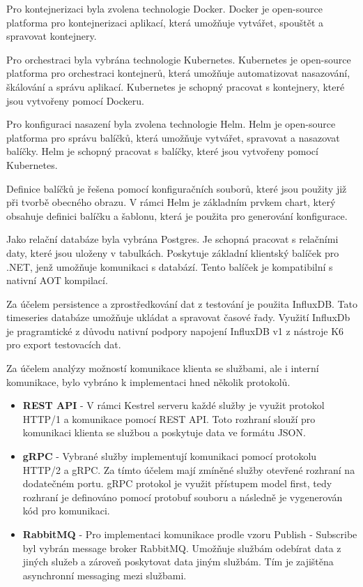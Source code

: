 Pro kontejnerizaci byla zvolena technologie Docker. Docker je open-source platforma pro kontejnerizaci aplikací, která umožňuje vytvářet, spouštět a spravovat kontejnery.

Pro orchestraci byla vybrána technologie Kubernetes. Kubernetes je open-source platforma pro orchestraci kontejnerů, která umožňuje automatizovat nasazování, škálování a správu aplikací. Kubernetes je schopný pracovat s kontejnery, které jsou vytvořeny pomocí Dockeru.


Pro konfiguraci nasazení byla zvolena technologie Helm. Helm je open-source platforma pro správu balíčků, která umožňuje vytvářet, spravovat a nasazovat balíčky. Helm je schopný pracovat s balíčky, které jsou vytvořeny pomocí Kubernetes.

Definice balíčků je řešena pomocí konfiguračních souborů, které jsou použity již při tvorbě obecného obrazu. V rámci Helm je základním prvkem chart, který obsahuje definici balíčku a šablonu, která je použita pro generování konfigurace.


Jako relační databáze byla vybrána Postgres. Je schopná pracovat s relačními daty, které jsou uloženy v tabulkách. Poskytuje základní klientský balíček pro .NET, jenž umožňuje komunikaci s databází. Tento balíček je kompatibilní s nativní AOT kompilací.

Za účelem persistence a zprostředkování dat z testování je použita InfluxDB. Tato timeseries databáze umožňuje ukládat a spravovat časové řady. Využití InfluxDb je pragramtické z důvodu nativní podpory napojení InfluxDB v1 z nástroje K6 pro export testovacích dat.


Za účelem analýzy možností komunikace klienta se službami, ale i interní komunikace, bylo vybráno k implementaci hned několik protokolů. 

\begin{itemize}
  \item \textbf{REST API} - V rámci Kestrel serveru každé služby je využit protokol HTTP/1 a komunikace pomocí REST API. Toto rozhraní slouží pro komunikaci klienta se službou a poskytuje data ve formátu JSON.
  \item \textbf{gRPC} - Vybrané služby implementují komunikaci pomocí protokolu HTTP/2 a gRPC. Za tímto účelem mají zmíněné služby otevřené rozhraní na dodatečném portu. gRPC protokol je využit přístupem model first, tedy rozhraní je definováno pomocí protobuf souboru a následně je vygenerován kód pro komunikaci.
  \item \textbf{RabbitMQ} - Pro implementaci komunikace prodle vzoru Publish - Subscribe byl vybrán message broker RabbitMQ. Umožňuje službám odebírat data z jiných služeb a zároveň poskytovat data jiným službám. Tím je zajištěna asynchronní messaging mezi službami.
\end{itemize}

